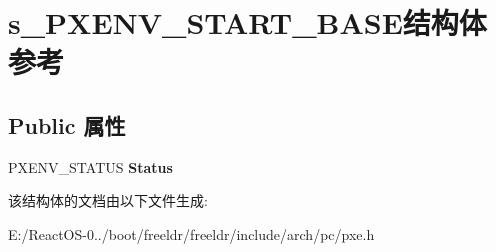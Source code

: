 \hypertarget{structs___p_x_e_n_v___s_t_a_r_t___b_a_s_e}{}\section{s\+\_\+\+P\+X\+E\+N\+V\+\_\+\+S\+T\+A\+R\+T\+\_\+\+B\+A\+S\+E结构体 参考}
\label{structs___p_x_e_n_v___s_t_a_r_t___b_a_s_e}
\subsection*{Public 属性}
\begin{DoxyCompactItemize}
\item 
\mbox{\label{structs___p_x_e_n_v___s_t_a_r_t___b_a_s_e_a9e1464b23fa9bd5b32674c1801b5f894}} 
P\+X\+E\+N\+V\+\_\+\+S\+T\+A\+T\+US {\bfseries Status}
\end{DoxyCompactItemize}


该结构体的文档由以下文件生成\+:\begin{DoxyCompactItemize}
\item 
E\+:/\+React\+O\+S-\/0../boot/freeldr/freeldr/include/arch/pc/pxe.\+h\end{DoxyCompactItemize}
